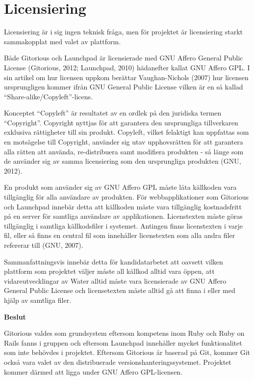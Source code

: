 \section{Licensiering}
Licensiering är i sig ingen teknisk fråga, men för projektet är licensiering starkt sammakopplat med valet av plattform. 

Både Gitorious och Launchpad är licensierade med GNU Affero General Public License (Gitorious, 2012; Launchpad, 2010) hädanefter kallat GNU Affero GPL. I sin artikel om hur licensen uppkom berättar Vaughan-Nichols (2007) hur licensen ursprungligen kommer ifrån GNU General Public License vilken är en så kallad “Share-alike/Copyleft”-licens.

Konceptet “Copyleft” är resultatet av en  ordlek på den juridiska termen “Copyright”. Copyright nyttjas för att garantera den ursprungliga tillverkaren exklusiva rättigheter till sin produkt. Copyleft, vilket felaktigt kan uppfattas som en motsägelse till Copyright, använder sig utav upphovsrätten för att garantera alla rätten att använda, re-distribuera samt modifiera produkten - så länge som de använder sig av samma licensiering som den ursprungliga produkten (GNU, 2012).

En produkt som använder sig av GNU Affero GPL måste låta källkoden vara tillgänglig för alla användare av produkten. För webbapplikationer som Gitorious och Launchpad innebär detta att källkoden måste vara tillgänglig kostnadsfritt på en server för samtliga användare av applikationen. 
Licenstexten måste göras tillgänglig i samtliga källkodsfiler i systemet. Antingen finns licenstexten i varje fil, eller så finns en central fil som innehåller licenstexten som alla andra filer refererar till (GNU, 2007).

Sammanfattningsvis innebär detta för kandidatarbetet att oavsett vilken plattform som projektet väljer måste all källkod alltid vara öppen, att vidareutvecklingar av Water alltid måste vara licensierade av GNU Affero General Public License och licensetexten måste alltid gå att finna i eller med hjälp av samtliga filer.

\begin{flushright}
  
  \textbf{Beslut}
  
  Gitorious valdes som grundsystem eftersom kompetens inom Ruby och Ruby on Rails fanns i gruppen och eftersom Launchpad innehåller mycket funktionalitet som inte behövdes i projektet. Eftersom Gitorious är baserad på Git, kommer Git också vara valet av den distribuerade versionshanteringssystemet. Projektet kommer därmed att ligga under GNU Affero GPL-licensen.  
  
\end{flushright}
